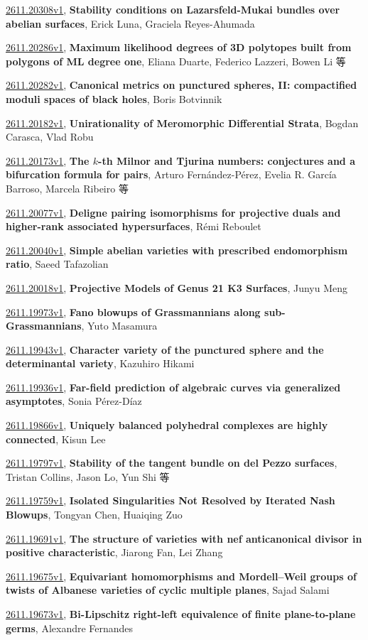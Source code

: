 \documentclass[9pt, a4paper]{article}
\theoremstyle{plain}
\theoremstyle{definition}
\theoremstyle{remark}
\newcommand{\arxiv}[3]{\href{https://arxiv.org/abs/#1}{#1}, \textbf{\textcolor{arxivblue}{#2}}, #3}
\begin{document}
\arxiv{2611.20308v1}{Stability conditions on Lazarsfeld-Mukai bundles over abelian surfaces}{Erick Luna, Graciela Reyes-Ahumada}

\arxiv{2611.20286v1}{Maximum likelihood degrees of 3D polytopes built from polygons of ML degree one}{Eliana Duarte, Federico Lazzeri, Bowen Li 等}

\arxiv{2611.20282v1}{Canonical metrics on punctured spheres, II: compactified moduli spaces of black holes}{Boris Botvinnik}

\arxiv{2611.20182v1}{Unirationality of Meromorphic Differential Strata}{Bogdan Carasca, Vlad Robu}

\arxiv{2611.20173v1}{The $k$-th Milnor and Tjurina numbers: conjectures and a bifurcation formula for pairs}{Arturo Fernández-Pérez, Evelia R. García Barroso, Marcela Ribeiro 等}

\arxiv{2611.20077v1}{Deligne pairing isomorphisms for projective duals and higher-rank associated hypersurfaces}{Rémi Reboulet}

\arxiv{2611.20040v1}{Simple abelian varieties with prescribed endomorphism ratio}{Saeed Tafazolian}

\arxiv{2611.20018v1}{Projective Models of Genus 21 K3 Surfaces}{Junyu Meng}

\arxiv{2611.19973v1}{Fano blowups of Grassmannians along sub-Grassmannians}{Yuto Masamura}

\arxiv{2611.19943v1}{Character variety of the punctured sphere and the determinantal variety}{Kazuhiro Hikami}

\arxiv{2611.19936v1}{Far-field prediction of algebraic curves via generalized asymptotes}{Sonia Pérez-Díaz}

\arxiv{2611.19866v1}{Uniquely balanced polyhedral complexes are highly connected}{Kisun Lee}

\arxiv{2611.19797v1}{Stability of the tangent bundle on del Pezzo surfaces}{Tristan Collins, Jason Lo, Yun Shi 等}

\arxiv{2611.19759v1}{Isolated Singularities Not Resolved by Iterated Nash Blowups}{Tongyan Chen, Huaiqing Zuo}

\arxiv{2611.19691v1}{The structure of varieties with nef anticanonical divisor in positive characteristic}{Jiarong Fan, Lei Zhang}

\arxiv{2611.19675v1}{Equivariant homomorphisms and Mordell--Weil groups of twists of Albanese varieties of cyclic multiple planes}{Sajad Salami}

\arxiv{2611.19673v1}{Bi-Lipschitz right-left equivalence of finite plane-to-plane germs}{Alexandre Fernandes}
\end{document}
